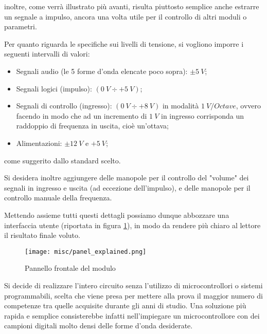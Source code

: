 inoltre, come verrà illustrato più avanti, risulta piuttosto semplice anche estrarre un
segnale a impulso, ancora una volta utile per il controllo di altri moduli o parametri.

Per quanto riguarda le specifiche sui livelli di tensione, si vogliono imporre i seguenti
intervalli di valori:

\begin{itemize}
    \item Segnali audio (le 5 forme d'onda elencate poco sopra): $\pm5\ V$;
    \item Segnali logici (impulso): $(0\ V\div+5\ V)$;
    \item Segnali di controllo (ingresso): $(0\ V\div+8\ V)$ in modalità $1\ V/Octave$, ovvero
          facendo in modo che ad un incremento di $1\ V$ in ingresso corrisponda un raddoppio
          di frequenza in uscita, cioè un'ottava;
    \item Alimentazioni: $\pm12\ V$ e $+5\ V$;
\end{itemize}

come suggerito dallo standard scelto.

Si desidera inoltre aggiungere delle manopole per il controllo del "volume" dei segnali
in ingresso e uscita (ad eccezione dell'impulso), e delle manopole per il controllo
manuale della frequenza.

Mettendo assieme tutti questi dettagli possiamo dunque abbozzare una interfaccia utente
(riportata in figura \ref{panel_explained}), in modo da rendere più chiaro al lettore il
risultato finale voluto.

\begin{figure}[ht]
    \centering
    \texttt{[image: misc/panel\_explained.png]}
    \caption{Pannello frontale del modulo}
    \label{panel_explained}
\end{figure}

Si decide di realizzare l'intero circuito senza l'utilizzo di microcontrollori o sistemi
programmabili, scelta che viene presa per mettere alla prova il maggior numero di competenze
tra quelle acquisite durante gli anni di studio. Una soluzione più rapida e semplice
consisterebbe infatti nell'impiegare un microcontrollore con dei campioni digitali molto
densi delle forme d'onda desiderate.

